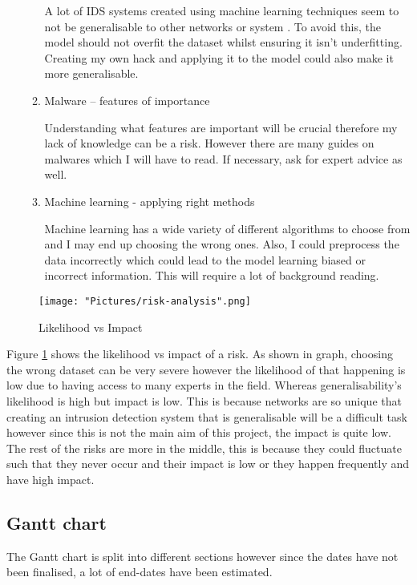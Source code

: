 \documentclass[11pt]{article}
\begin{document}
\begin{enumerate}
\begin{enumerate}
    A lot of IDS systems created using machine learning techniques seem to not be generalisable to other networks or system \cite{methodology-general}. To avoid this, the model should not overfit the dataset whilst ensuring it isn't underfitting. Creating my own hack and applying it to the model could also make it more generalisable.

    \item{Malware – features of importance}

    Understanding what features are important will be crucial therefore my lack of knowledge can be a risk. However there are many guides on malwares which I will have to read. If necessary, ask for expert advice as well.

    \item{Machine learning - applying right methods}

    Machine learning has a wide variety of different algorithms to choose from and I may end up choosing the wrong ones. Also, I could preprocess the data incorrectly which could lead to the model learning biased or incorrect information. This will  require a lot of background reading.
  \end{enumerate}
\end{enumerate}

\begin{figure}[h!]
   \texttt{[image: "Pictures/risk-analysis".png]}
   \caption{Likelihood vs Impact}
   \label{fig:risk-analysis}
\end{figure}


Figure \ref{fig:risk-analysis} shows the likelihood vs impact of a risk. As shown in graph, choosing the wrong dataset can be very severe however the likelihood of that happening is low due to having access to many experts in the field. Whereas generalisability's likelihood is high but impact is low. This is because networks are so unique that creating an intrusion detection system that is generalisable will be a difficult task however since this is not the main aim of this project, the impact is quite low. The rest of the risks are more in the middle, this is because they could fluctuate such that they never occur and their impact is low or they happen frequently and have high impact.


\subsection{Gantt chart}
The Gantt chart is split into different sections however since the dates have not been finalised, a lot of end-dates have been estimated. 
\end{document}
